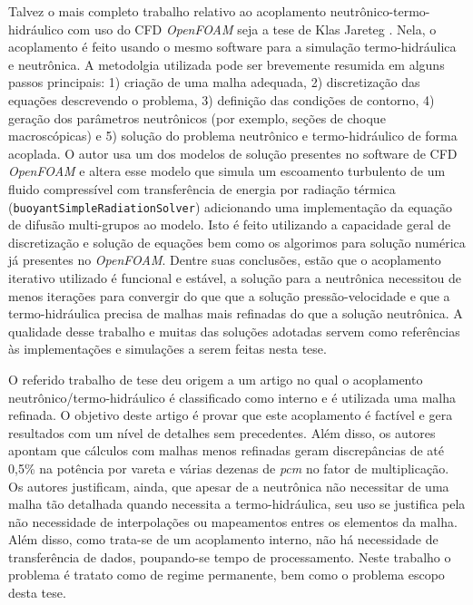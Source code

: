 Talvez o mais completo trabalho relativo ao acoplamento neutrônico-termo-hidráulico com uso do 
CFD \textit{OpenFOAM} seja a tese de Klas Jareteg \cite{Jareteg2012}. Nela, o acoplamento é feito usando o mesmo 
software para a simulação termo-hidráulica e neutrônica. A metodolgia utilizada pode ser brevemente 
resumida em alguns passos principais: 1) criação de uma malha adequada, 2) discretização das 
equações descrevendo o problema, 3) definição das condições de contorno, 4) geração dos 
parâmetros neutrônicos (por exemplo, seções de choque macroscópicas) e 5) solução do 
problema neutrônico e termo-hidráulico de forma acoplada. O autor usa um dos modelos de solução presentes no 
software de CFD \textit{OpenFOAM} \cite{OpenFOAM2013} e 
altera esse modelo que simula um escoamento turbulento de um fluido compressível com transferência de energia
por radiação térmica (\texttt{buoyantSimpleRadiationSolver}) adicionando uma implementação da equação de difusão multi-grupos 
ao modelo. Isto é feito utilizando a capacidade geral de discretização e solução de equações bem como os algorimos 
para solução numérica já presentes no \textit{OpenFOAM}. Dentre suas conclusões, estão que o acoplamento iterativo 
utilizado é funcional e estável, a solução para a neutrônica necessitou de menos iterações para convergir 
do que que a solução pressão-velocidade e que a termo-hidráulica precisa de malhas mais refinadas do que a solução 
neutrônica. A qualidade desse trabalho e muitas das soluções adotadas servem como referências às implementações 
e simulações a serem feitas nesta tese.

O referido trabalho de tese deu origem a um artigo \cite{Jareteg2014} no qual o acoplamento
neutrônico/termo-hidráulico é classificado como interno e é utilizada uma malha
refinada. O objetivo deste artigo é provar que
este acoplamento é factível e gera resultados com um nível de detalhes sem precedentes. Além
disso, os autores apontam que cálculos com malhas menos refinadas geram discrepâncias
de até 0,5\% na potência por vareta e várias dezenas de \textit{pcm} no fator de multiplicação.
Os autores justificam, ainda, que apesar de a neutrônica não necessitar de uma malha
tão detalhada quando necessita a termo-hidráulica, seu uso se justifica pela não necessidade
de interpolações ou mapeamentos entres os elementos da malha. Além disso, como trata-se
de um acoplamento interno, não há necessidade de transferência de dados, poupando-se
tempo de processamento.
Neste trabalho o problema é tratato como de regime permanente, bem como o problema escopo
desta tese.


